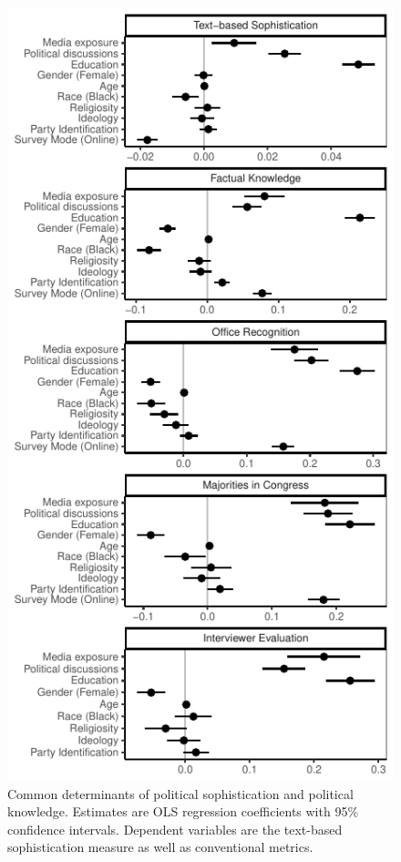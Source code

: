 \documentclass[12pt]{article}
\begin{document}
\begin{figure}\centering
\includegraphics{../fig/models.pdf}
\caption{Common determinants of political sophistication and political knowledge. Estimates are OLS regression coefficients with 95\% confidence intervals. Dependent variables are the text-based sophistication measure as well as conventional metrics.}
\end{figure}
\end{document}
